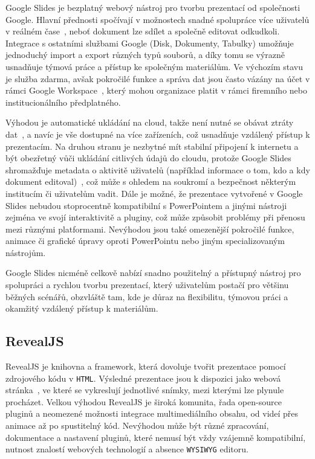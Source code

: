 Google Slides je bezplatný webový nástroj pro tvorbu prezentací od společnosti Google. 
Hlavní přednosti spočívají v možnostech snadné spolupráce více uživatelů v reálném čase~\cite{slides}, neboť dokument lze sdílet a společně editovat odkudkoli.
Integrace s ostatními službami Google (Disk, Dokumenty, Tabulky) umožňuje jednoduchý import a export různých typů souborů, a díky tomu se výrazně usnadňuje týmová práce a přístup ke společným materiálům. 
Ve výchozím stavu je služba zdarma, avšak pokročilé funkce a správa dat jsou často vázány na účet v rámci Google Workspace~\cite{slides}, který mohou organizace platit v rámci firemního nebo institucionálního předplatného. 

Výhodou je automatické ukládání na cloud, takže není nutné se obávat ztráty dat~\cite{slides}, a navíc je vše dostupné na více zařízeních, což usnadňuje vzdálený přístup k prezentacím. 
Na druhou stranu je nezbytné mít stabilní připojení k internetu a být obezřetný vůči ukládání citlivých údajů do cloudu, protože Google Slides shromažďuje metadata o aktivitě uživatelů (například informace o tom, kdo a kdy dokument editoval)~\cite{google_terms}, což může s ohledem na soukromí a bezpečnost některým institucím či uživatelům vadit. 
Dále je možné, že prezentace vytvořené v Google Slides nebudou stoprocentně kompatibilní s PowerPointem a jinými nástroji zejména ve svojí interaktivitě a pluginy, což může způsobit problémy při přenosu mezi různými platformami. 
Nevýhodou jsou také omezenější pokročilé funkce, animace či grafické úpravy oproti PowerPointu nebo jiným specializovaným nástrojům. 

Google Slides nicméně celkově nabízí snadno použitelný a přístupný nástroj pro spolupráci a rychlou tvorbu prezentací, který uživatelům postačí pro většinu běžných scénářů, obzvláště tam, kde je důraz na flexibilitu, týmovou práci a okamžitý vzdálený přístup k materiálům.


\subsection{RevealJS}

RevealJS je knihovna a framework, která dovoluje tvořit prezentace pomocí zdrojového kódu v \texttt{HTML}. 
Výsledné prezentace jsou k dispozici jako webová stránka~\cite{revealjs}, ve které se vykreslují jednotlivé snímky, mezi kterými lze plynule procházet. 
Velkou výhodou RevealJS je široká komunita, řada open-source pluginů a neomezené možnosti integrace multimediálního obsahu, od videí přes animace až po spustitelný kód. 
Nevýhodou může být různé zpracování, dokumentace a nastavení pluginů, které nemusí být vždy vzájemně kompatibilní, nutnost znalostí webových technologií a absence \texttt{WYSIWYG} editoru. 

